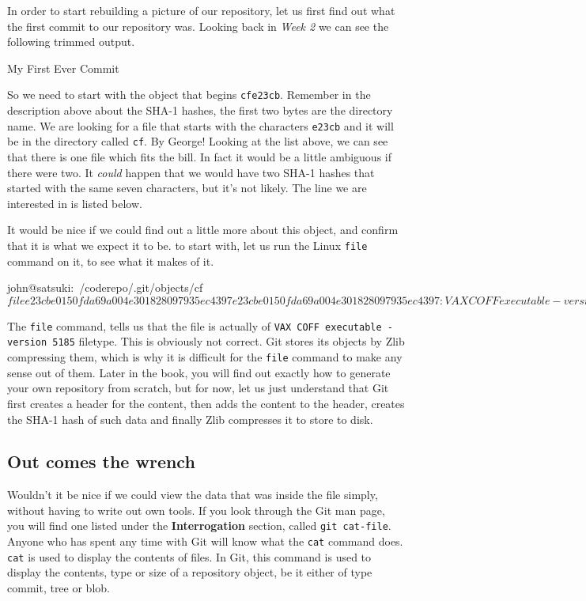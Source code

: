 In order to start rebuilding a picture of our repository, let us first find out what the first commit to our repository was.
Looking back in \emph{Week 2} we can see the following trimmed output.

\begin{code}
 My First Ever Commit
\end{code}

So we need to start with the object that begins \texttt{cfe23cb}.
Remember in the description above about the SHA-1 hashes, the first two bytes are the directory name.
We are looking for a file that starts with the characters \texttt{e23cb} and it will be in the directory called \texttt{cf}.
By George! Looking at the list above, we can see that there is one file which fits the bill.
In fact it would be a little ambiguous if there were two.
It \emph{could} happen that we would have two SHA-1 hashes that started with the same seven characters, but it's not likely.
The line we are interested in is listed below.

\begin{code}
./cf/e23cbe0150fda69a004e301828097935ec4397}
\end{code}

It would be nice if we could find out a little more about this object, and confirm that it is what we expect it to be.
to start with, let us run the Linux \texttt{file} command on it, to see what it makes of it.

\begin{code}
john@satsuki:~/coderepo/.git/objects/cf$ file e23cbe0150fda69a004e301828097935ec4397
e23cbe0150fda69a004e301828097935ec4397: VAX COFF executable - version 5185
john@satsuki:~/coderepo/.git/objects/cf$
\end{code}

The \texttt{file} command, tells us that the file is actually of \texttt{VAX COFF executable - version 5185} filetype.
This is obviously not correct.
Git stores its objects by Zlib compressing them, which is why it is difficult for the \texttt{file} command to make any sense out of them.
Later in the book, you will find out exactly how to generate your own repository from scratch, but for now, let us just understand that Git first creates a header for the content, then adds the content to the header, creates the SHA-1 hash of such data and finally Zlib compresses it to store to disk.

\subsection{Out comes the wrench}
Wouldn't it be nice if we could view the data that was inside the file simply, without having to write out own tools.
If you look through the Git man page, you will find one listed under the \textbf{Interrogation} section, called \texttt{git cat-file}.
Anyone who has spent any time with Git will know what the \texttt{cat} command does.
\texttt{cat} is used to display the contents of files.
In Git, this command is used to display the contents, type or size of a repository object, be it either of type commit, tree or blob.

